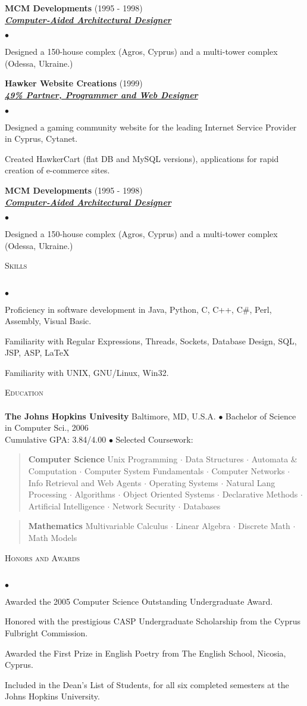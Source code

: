 \documentclass{article}
\newcommand{\area}[2]{\vspace*{-9pt} \begin{verse}\textbf{#1}   #2 \end{verse}  }
\newcommand{\lineunder}{\vspace*{-8pt} \\ \hspace*{-18pt} \hrulefill \\}
\newcommand{\header}[1]{{\hspace*{-15pt}\vspace*{6pt} \textsc{#1}} \vspace*{-6pt} \lineunder}
\newcommand{\employer}[3]{{ \textbf{#1} (#2)\\ \underline{\textbf{\emph{#3}}}\\  }}
\newenvironment{achievements}{\begin{list}{$\bullet$}{\topsep 0pt \itemsep -2pt}}{\vspace*{4pt}\end{list}}
\newcommand{\schoolwithcourses}[4]{
 \textbf{#1} #2 $\bullet$ #3\\ 
#4 $\bullet$  Selected Coursework:\\
\vspace*{5pt}
}
\begin{document}
\employer{MCM Developments}{1995 - 1998}{Computer-Aided Architectural Designer}
	\begin{achievements}
	\item Designed a 150-house complex (Agros, Cyprus) and a multi-tower complex (Odessa, Ukraine.)
	\end{achievements}

\employer{Hawker Website Creations}{1999}{49\% Partner, Programmer and Web Designer}
	\begin{achievements}
	\item Designed a gaming community website for the leading Internet Service Provider in Cyprus, Cytanet.
	\item Created HawkerCart (flat DB and MySQL versions), applications for rapid creation of e-commerce sites.
	\end{achievements}
\employer{MCM Developments}{1995 - 1998}{Computer-Aided Architectural Designer}
	\begin{achievements}
	\item Designed a 150-house complex (Agros, Cyprus) and a multi-tower complex (Odessa, Ukraine.)
	\end{achievements}

\header{Skills}
\begin{achievements}
\item Proficiency in software development in Java, Python, C, C++, C\#, Perl, Assembly, Visual Basic.
\item Familiarity with Regular Expressions, Threads, Sockets, Database Design, SQL, JSP, ASP, \LaTeX
\item Familiarity with UNIX, GNU/Linux, Win32.
\end{achievements}

\header{Education}

\schoolwithcourses{The Johns Hopkins Univesity}{Baltimore, MD, U.S.A.}{Bachelor of Science in Computer Sci., 2006}
{Cumulative GPA: 3.84/4.00}
	\area{Computer Science}{ Unix Programming $\cdot$ Data Structures $\cdot$ Automata \& Computation $\cdot$ Computer System
Fundamentals $\cdot$ Computer Networks $\cdot$ Info Retrieval and Web Agents $\cdot$ Operating Systems $\cdot$
Natural Lang Processing $\cdot$ Algorithms $\cdot$ Object Oriented Systems $\cdot$ Declarative Methods $\cdot$
Artificial Intelligence $\cdot$ Network Security $\cdot$ Databases}
	\area{Mathematics}{Multivariable Calculus $\cdot$ Linear Algebra $\cdot$ Discrete Math $\cdot$ Math Models}

\header{Honors and Awards}
\begin{achievements}
\item  Awarded the 2005 Computer Science Outstanding Undergraduate Award.
\item Honored with the prestigious CASP Undergraduate Scholarship from the Cyprus Fulbright Commission.
\item  Awarded the First Prize in English Poetry from The English School, Nicosia, Cyprus.
\item Included in the Dean's List of Students, for all six completed semesters at the Johns Hopkins University.
\end{achievements}
\end{document}
